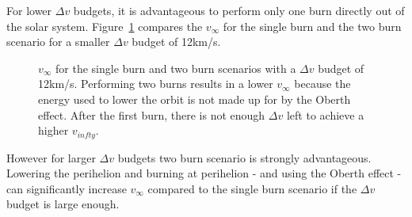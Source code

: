 \documentclass[12pt]{article} %
\begin{document}
For lower $\Delta v$ budgets, it is advantageous to perform only one burn directly out of the solar system. Figure~\ref{fig:lowdv} compares the $v_{\infty}$ for the single burn and the two burn scenario for a smaller $\Delta v$ budget of 12km/s.

\begin{figure}[H]
\caption{$v_{\infty}$ for the single burn and two burn scenarios with a $\Delta v$ budget of 12km/s. Performing two burns results in a lower $v_{\infty}$ because the energy used to lower the orbit is not made up for by the Oberth effect. After the first burn, there is not enough $\Delta v$ left to achieve a higher $v_{infty}$.}
\label{fig:lowdv}
\end{figure}

However for larger $\Delta v$ budgets two burn scenario is strongly advantageous. Lowering the perihelion and burning at perihelion - and using the Oberth effect - can significantly increase $v_{\infty}$ compared to the single burn scenario if the $\Delta v$ budget is large enough.
\end{document}
